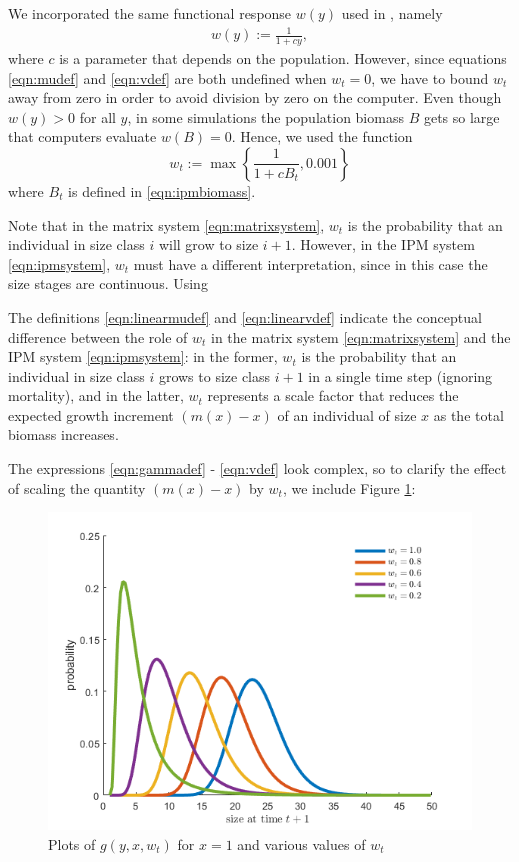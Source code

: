 We incorporated the same functional response $w(y)$ used in \cite{Callahan2019}, namely 
\begin{align}
	w(y) := \frac{1}{1 + c y}, \label{eqn:wdef}
\end{align}
where $c$ is a parameter that depends on the population. However, since equations \eqref{eqn:mudef} and \eqref{eqn:vdef} are both undefined when $w_t = 0$, we have to bound $w_t$ away from zero in order to avoid division by zero on the computer. Even though $w(y)>0$ for all $y$, in some simulations the population biomass $B$ gets so large that computers evaluate $w(B)=0$. Hence, we used the function
\[w_t := \max \left\{\frac{1}{1 + c B_t}, 0.001 \right\}\]
where $B_t$ is defined in \ref{eqn:ipmbiomass}. 

Note that in the matrix system \eqref{eqn:matrixsystem}, $w_t$ is the probability that an individual in size class $i$ will grow to size $i+1$. However, in the IPM system \eqref{eqn:ipmsystem}, $w_t$ must have a different interpretation, since in this case the size stages are continuous. Using 

The definitions \eqref{eqn:linearmudef} and \eqref{eqn:linearvdef} indicate the conceptual difference between the role of $w_t$ in the matrix system \eqref{eqn:matrixsystem} and the IPM system \eqref{eqn:ipmsystem}: in the former, $w_t$ is the probability that an individual in size class $i$ grows to size class $i + 1$ in a single time step (ignoring mortality), and in the latter, $w_t$ represents a scale factor that reduces the expected growth increment $(m(x) - x)$ of an individual of size $x$ as the total biomass increases.

The expressions \eqref{eqn:gammadef} - \eqref{eqn:vdef} look complex, so to clarify the effect of scaling the quantity $(m(x) - x)$ by $w_t$, we include Figure \ref{fig:nonlinear_comparison}:

\begin{figure}[H]
	\centering
	\includegraphics[width=0.6\linewidth]{Images/nonlinear_comparison}
	\caption{Plots of $g(y, x, w_t)$ for $x = 1$ and various values of $w_t$}
	\label{fig:nonlinear_comparison}
\end{figure}

